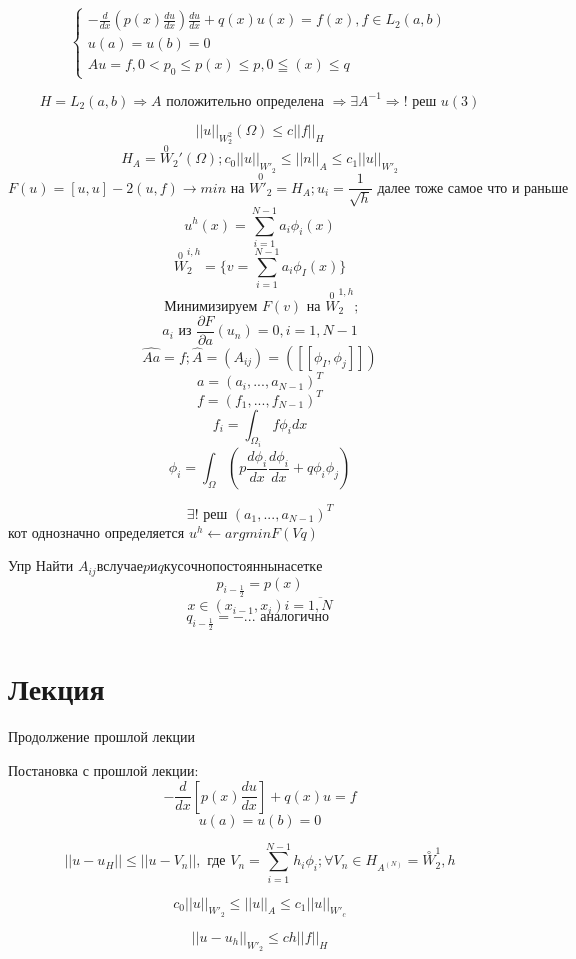 \documentclass[12pt, a4paper]{article}
\begin{document}
\[
\left\{
\begin{array}{l}
    -\frac{d}{dx}(p(x) \frac{du}{dx})\frac{du}{dx} + q(x)u(x) = f(x), f \in L_2(a, b) \\
    u(a) = u(b) = 0 \\
    Au = f,  0< p_0 \leq p(x) \leq p, 0 \leqq(x) \leq q
\end{array}
\right.
\]

\[ H = L_2 (a, b) \Rightarrow A \textrm{ положительно определена } \Rightarrow \exists A^{-1} \Rightarrow ! \textrm{ реш } u(3) \]

\[ \ \]
\[ {||u||}_{W_2^2} (\Omega) \leq c {||f||}_H \]
\[ H_A = \overset{0}{W}_2'(\Omega); c_0 {||u||}_{W'_2} \leq {||n||}_A \leq c_1 {||u||}_{{W'}_2} \]
\[ F(u) = [u, u] -2 (u, f) \rightarrow min \textrm{ на } \overset{0}{{W'}_2} = H_A; u_i = \frac{1}{\sqrt{h}} \textrm{ далее тоже самое что и раньше } \]
\[ u^h(x) = \sum_{i=1}^{N-1} a_i \phi_i (x) \]
\[ \overset{0}{W}_2^{i, h} = \{ v = \sum_{i=1}^{N-1} a_i \phi_I (x) \} \]
\[ \textrm{ Минимизируем }F(v) \textrm{ на } \overset{0}{W}_2^{1, h}; \]
\[ a_i \textrm{ из }\frac{\partial F}{\partial a}(u_n) = 0, i=1, N-1 \]
\[ \hat{A a} = f; \hat{A} = (A_{ij}) = ([[\phi_I, \phi_j]]) \]
\[ a = (a_{i}, ... , a_{N-1})^T \]
\[ {f = (f_1, ... , f_{N-1})}^T \]
\[ f_i = \int_{\Omega_i}^{} f \phi_i dx \]
\[ \phi_i = \int_{\Omega}^{} (p \frac{d\phi_i}{dx}\frac{d \phi_i}{dx} + q \phi_i \phi_j) \]

\[ \exists ! \textrm{ реш } {(a_1, ..., a_{N-1})}^T \]
кот однозначно определяется $ u^h \leftarrow argmin F(Vq) $

Упр Найти $ A_{ij} в случае p и q кусочнопостоянны на сетке$
\[ p_{i-\frac{1}{2}} = p(x)\]
\[x\in (x_{i-1}, x_i) i = \overline{1, N} \]
\[ q_{i-\frac{1}{2}} = - ... \textrm{ аналогично } \]

\section{Лекция}

Продолжение прошлой лекции

Постановка с прошлой лекции:
\[ -\frac{d}{dx} [ p(x) \frac{du}{dx}] + q(x) u = f \]
\[ u(a) = u(b) = 0 \]

\[ ||u - u_{H}|| \leq ||u - V_n||,\textrm{ где } V_n = \sum_{i=1}^{N-1} h_i \phi_i; \forall V_n \in H_{A^{(N)}} = \overset{\circ}{W}_2^1, h \]

\[ c_0 {||u||}_{{W'}_2} \leq {||u||}_A \leq c_1 {||u||}_{{W'}_c} \]

\[ {||u-u_h||}_{{W'}_2} \leq ch {||f||}_H \]
\end{document}
